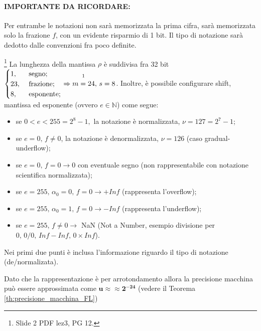 \paragraph{IMPORTANTE DA RICORDARE: }Per entrambe le notazioni non sarà memorizzata la prima cifra, sarà memorizzata solo la frazione $f$, con un evidente risparmio di 1 bit. Il tipo di notazione sarà dedotto dalle convenzioni fra poco definite.

\begin{definition}\footnote{Slide 2 PDF lez3, PG 12.}
	La lunghezza della mantissa $\rho$ è suddivisa fra 32 bit $\begin{cases}
		1, &\text{ segno};\\
		23, &\text{ frazione};\\
		8, &\text{ esponente};
	\end{cases}\Rightarrow \overset{\footnotemark}{m=24},\, s=8$. Inoltre, è possibile configurare shift, mantissa ed esponente (ovvero $e\in\mathbb N$) come segue:
	
	\begin{itemize}
		\item se $0<e<255=2^8-1,$ la notazione è normalizzata, $\nu=127=2^7-1$;
		\item se $e=0,\, f\neq 0$, la notazione è denormalizzata, $\nu=126$ (caso gradual-underflow);
		\item se $e=0,\, f=0\rightarrow 0$ con eventuale segno (non rappresentabile con notazione scientifica normalizzata);
		\item se $e=255,\,\alpha_0=0,\,f=0\rightarrow +Inf$ (rappresenta l'overflow);
		\item se $e=255,\,\alpha_0=1,\,f=0\rightarrow -Inf$ (rappresenta l'underflow);
		\item se $e=255, \,f\neq 0 \rightarrow$ NaN (Not a Number, esempio divisione per $0,\, 0/0,\, Inf-Inf,\, 0\times Inf$).
	\end{itemize}
\end{definition}
Nei primi due punti è inclusa l'informazione riguardo il tipo di notazione (de/normalizata).

\begin{remark}
	Dato che la rappresentazione è per arrotondamento allora la precisione macchina può essere approssimata come $\boldsymbol{u\approx\approx 2^{-24}}$ (vedere il Teorema \ref{th:precisione_macchina_FL})
\end{remark}

